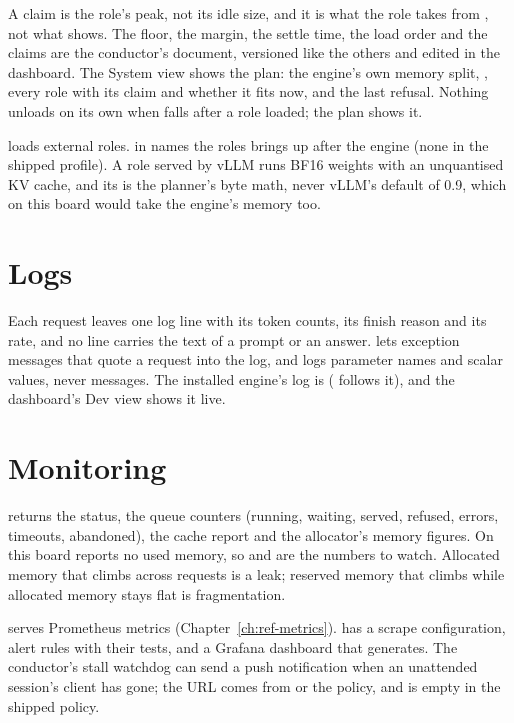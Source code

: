 A claim is the role's peak, not its idle size, and it is what the role takes from , not what  shows. The floor, the margin, the settle time, the load order and the claims are the conductor's  document, versioned like the others and edited in the dashboard. The System view shows the plan: the engine's own memory split, , every role with its claim and whether it fits now, and the last refusal. Nothing unloads on its own when  falls after a role loaded; the plan shows it.

 loads external roles.  in  names the roles  brings up after the engine (none in the shipped profile). A role served by vLLM runs BF16 weights with an unquantised KV cache, and its  is the planner's byte math, never vLLM's default of 0.9, which on this board would take the engine's memory too.

\section{Logs}

Each request leaves one log line with its token counts, its finish reason and its rate, and no line carries the text of a prompt or an answer.  lets exception messages that quote a request into the log, and  logs parameter names and scalar values, never messages. The installed engine's log is  ( follows it), and the dashboard's Dev view shows it live.

\section{Monitoring}

 returns the status, the queue counters (running, waiting, served, refused, errors, timeouts, abandoned), the cache report and the allocator's memory figures. On this board  reports no used memory, so  and  are the numbers to watch. Allocated memory that climbs across requests is a leak; reserved memory that climbs while allocated memory stays flat is fragmentation.

 serves Prometheus metrics (Chapter~\ref{ch:ref-metrics}).  has a scrape configuration, alert rules with their tests, and a Grafana dashboard that  generates. The conductor's stall watchdog can send a push notification when an unattended session's client has gone; the URL comes from  or the policy, and is empty in the shipped policy.

